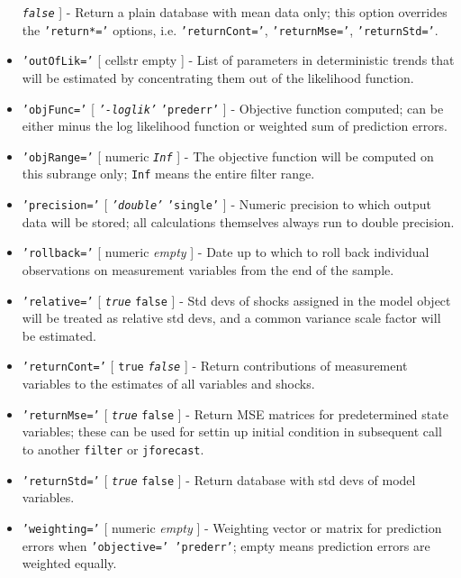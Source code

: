 \begin{itemize}
   \emph{\texttt{false}} {]} - Return a plain database with mean data
   only; this option overrides the \texttt{'return*='} options, i.e.
   \texttt{'returnCont='}, \texttt{'returnMse='}, \texttt{'returnStd='}.
 \item
   \texttt{'outOfLik='} {[} cellstr \textbar{} empty {]} - List of
   parameters in deterministic trends that will be estimated by
   concentrating them out of the likelihood function.
 \item
   \texttt{'objFunc='} {[} \emph{\texttt{'-loglik'}} \textbar{}
   \texttt{'prederr'} {]} - Objective function computed; can be either
   minus the log likelihood function or weighted sum of prediction
   errors.
 \item
   \texttt{'objRange='} {[} numeric \textbar{} \emph{\texttt{Inf}} {]} -
   The objective function will be computed on this subrange only;
   \texttt{Inf} means the entire filter range.
 \item
   \texttt{'precision='} {[} \emph{\texttt{'double'}} \textbar{}
   \texttt{'single'} {]} - Numeric precision to which output data will be
   stored; all calculations themselves always run to double precision.
 \item
   \texttt{'rollback='} {[} numeric \textbar{} \emph{empty} {]} - Date up
   to which to roll back individual observations on measurement variables
   from the end of the sample.
 \item
   \texttt{'relative='} {[} \emph{\texttt{true}} \textbar{}
   \texttt{false} {]} - Std devs of shocks assigned in the model object
   will be treated as relative std devs, and a common variance scale
   factor will be estimated.
 \item
   \texttt{'returnCont='} {[} \texttt{true} \textbar{}
   \emph{\texttt{false}} {]} - Return contributions of measurement
   variables to the estimates of all variables and shocks.
 \item
   \texttt{'returnMse='} {[} \emph{\texttt{true}} \textbar{}
   \texttt{false} {]} - Return MSE matrices for predetermined state
   variables; these can be used for settin up initial condition in
   subsequent call to another \texttt{filter} or \texttt{jforecast}.
 \item
   \texttt{'returnStd='} {[} \emph{\texttt{true}} \textbar{}
   \texttt{false} {]} - Return database with std devs of model variables.
 \item
   \texttt{'weighting='} {[} numeric \textbar{} \emph{empty} {]} -
   Weighting vector or matrix for prediction errors when
   \texttt{'objective=' 'prederr'}; empty means prediction errors are
   weighted equally.
 \end{itemize}
 

